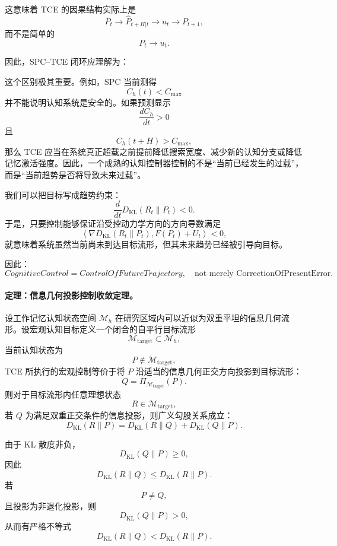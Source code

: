 这意味着 TCE 的因果结构实际上是
\[
P_t
\rightarrow
\widehat P_{t+H|t}
\rightarrow
u_t
\rightarrow
P_{t+1},
\]
而不是简单的
\[
P_t
\rightarrow
u_t.
\]

因此，SPC--TCE 闭环应理解为：
\begin{statementbox}
\centering
{}
\end{statementbox}

这个区别极其重要。例如，SPC 当前测得
\[
C_h(t)<C_{\max}
\]
并不能说明认知系统是安全的。如果预测显示
\[
\frac{dC_h}{dt}>0
\]
且
\[
C_h(t+H)>C_{\max},
\]
那么 TCE 应当在系统真正超载之前提前降低搜索宽度、减少新的认知分支或降低记忆激活强度。因此，一个成熟的认知控制器控制的不是``当前已经发生的过载''，而是``当前趋势是否将导致未来过载''。

我们可以把目标写成趋势约束：
\[
\frac{d}{dt}
D_{\mathrm{KL}}
\left(
R_t\|P_t
\right)
<0.
\]
于是，只要控制能够保证沿受控动力学方向的方向导数满足
\[
\left\langle
\nabla D_{\mathrm{KL}}(R_t\|P_t),
F(P_t)+U_t
\right\rangle
<0,
\]
就意味着系统虽然当前尚未到达目标流形，但其未来趋势已经被引导向目标。

因此：
\[
\boxed{
CognitiveControl
=
ControlOfFutureTrajectory,
\quad
\text{not merely CorrectionOfPresentError}.
}
\]

\paragraph{定理：信息几何投影控制收敛定理。}

设工作记忆认知状态空间 $\mathcal{M}_{h}$ 在研究区域内可以近似为双重平坦的信息几何流形。设宏观认知目标定义一个闭合的自平行目标流形
\[
\mathcal{M}_{\mathrm{target}}
\subset
\mathcal{M}_{h},
\]
当前认知状态为
\[
P\notin\mathcal{M}_{\mathrm{target}},
\]
TCE 所执行的宏观控制等价于将 $P$ 沿适当的信息几何正交方向投影到目标流形：
\[
Q
=
\Pi_{\mathcal{M}_{\mathrm{target}}}(P).
\]
则对于目标流形内任意理想状态
\[
R\in\mathcal{M}_{\mathrm{target}},
\]
若 $Q$ 为满足双重正交条件的信息投影，则广义勾股关系成立：
\[
\boxed{
D_{\mathrm{KL}}(R\|P)
=
D_{\mathrm{KL}}(R\|Q)
+
D_{\mathrm{KL}}(Q\|P).
}
\label{eq:generalized-pythagorean-cognitive-control}
\]

由于 KL 散度非负，
\[
D_{\mathrm{KL}}(Q\|P)\ge 0,
\]
因此
\[
D_{\mathrm{KL}}(R\|Q)
\le
D_{\mathrm{KL}}(R\|P).
\]
若
\[
P\neq Q,
\]
且投影为非退化投影，则
\[
D_{\mathrm{KL}}(Q\|P)>0,
\]
从而有严格不等式
\[
\boxed{
D_{\mathrm{KL}}(R\|Q)
<
D_{\mathrm{KL}}(R\|P).
}
\label{eq:projection-monotonic-decrease}
\]

